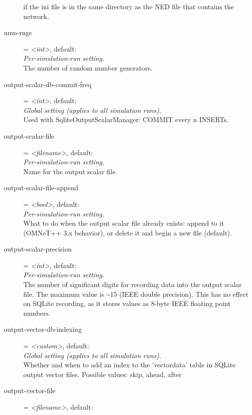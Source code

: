 \begin{description}
    if the ini file is in the same directory as the NED file that contains the
    network.
\item[num-rngs] = \textit{<int>}, default: \\
    \textit{Per-simulation-run setting.}\\
    The number of random number generators.
\item[output-scalar-db-commit-freq] = \textit{<int>}, default: \\
    \textit{Global setting (applies to all simulation runs).}\\
    Used with SqliteOutputScalarManager: COMMIT every n INSERTs.
\item[output-scalar-file] = \textit{<filename>}, default: \\
    \textit{Per-simulation-run setting.}\\
    Name for the output scalar file.
\item[output-scalar-file-append] = \textit{<bool>}, default: \\
    \textit{Per-simulation-run setting.}\\
    What to do when the output scalar file already exists: append to it
    (OMNeT++ 3.x behavior), or delete it and begin a new file (default).
\item[output-scalar-precision] = \textit{<int>}, default: \\
    \textit{Per-simulation-run setting.}\\
    The number of significant digits for recording data into the output scalar
    file. The maximum value is {\textasciitilde}15 (IEEE double precision).
    This has no effect on SQLite recording, as it stores values as 8-byte IEEE
    floating point numbers.
\item[output-vector-db-indexing] = \textit{<custom>}, default: \\
    \textit{Global setting (applies to all simulation runs).}\\
    Whether and when to add an index to the 'vectordata' table in SQLite output
    vector files. Possible values: skip, ahead, after
\item[output-vector-file] = \textit{<filename>}, default: \\

\end{description}
